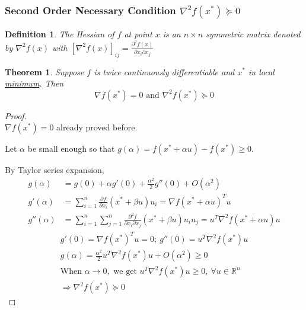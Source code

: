 \documentclass[11pt,a4paper]{article}
\newtheorem{theorem}{Theorem}
\newtheorem{definition}{Definition}
\begin{document}
\subsubsection{Second Order Necessary Condition $\nabla^2 f(x^*)\succeq 0$}
\begin{definition}
The Hessian of $f$ at point $x$ is an $n\times n$ symmetric matrix denoted by $\nabla^2 f(x)$ with $[\nabla^2 f(x)]_{ij}=\frac{\partial^2 f(x)}{\partial x_i\partial x_j}$
\end{definition}
\begin{theorem}
Suppose $f$ is twice continuously differentiable and $x^*$ in local \underline{minimum}. Then $$\nabla f(x^*)=0\text{ and }\nabla^2 f(x^*)\succeq 0$$
\end{theorem}
\begin{proof}
\quad\\
$\nabla f(x^*)=0$ already proved before.

Let $\alpha$ be small enough so that $g(\alpha)=f(x^*+\alpha u)-f(x^*)\geq 0$.

By Taylor series expansion,
\begin{equation}
    \begin{aligned}
        g(\alpha)&=g(0)+\alpha g'(0)+\frac{\alpha^2}{2}g''(0)+O(\alpha^2)\\
        g'(\alpha)&=\sum_{i=1}^n \frac{\partial f}{\partial x_i}(x^*+\beta u)u_i=\nabla f(x^*+\alpha u)^T u\\
        g''(\alpha)&=\sum_{i=1}^n\sum_{j=1}^n \frac{\partial^2 f}{\partial x_i\partial x_j}(x^*+\beta u)u_iu_j=u^T\nabla^2 f(x^*+\alpha u) u
    \end{aligned}
    \nonumber
\end{equation}
\begin{equation}
    \begin{aligned}
        g'(0)=\nabla f(x^*)^T u=0;\ g''(0)=u^T\nabla^2 f(x^*) u\\
        g(\alpha)=\frac{\alpha^2}{2}u^T\nabla^2 f(x^*) u+O(\alpha^2)\geq 0\\
        \text{When }\alpha \rightarrow 0,\text{ we get } u^T\nabla^2 f(x^*) u\geq 0,\ \forall u\in \mathbb{R}^n\\
        \Rightarrow	\nabla^2 f(x^*)\succeq 0
    \end{aligned}
    \nonumber
\end{equation}
\end{proof}
\end{document}
